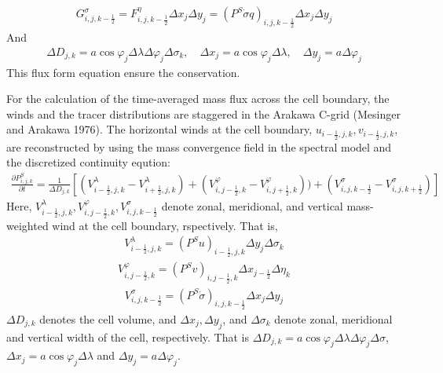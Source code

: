 \begin{eqnarray}G^{\sigma}_{i,j,k-\frac{1}{2}}=F^{\eta}_{i,j,k-\frac{1}{2}} \Delta x_{j} \Delta y_{j}=(P^{S} \dot{\sigma} q)_{i,j,k-\frac{1}{2}} \Delta x_{j} \Delta y_{j}\end{eqnarray} And
\begin{eqnarray}\Delta D_{j,k}=a \cos \varphi_{j} \Delta \lambda \Delta \varphi_{j} \Delta \sigma_{k},\quad \Delta x_{j}=a \cos \varphi_{j} \Delta \lambda,\quad \Delta y_{j}=a \Delta \varphi_{j}\end{eqnarray} This flux form
equation ensure the conservation.

For the calculation of the time-averaged mass flux across the cell boundary, the winds and the tracer distributions are staggered in the Arakawa C-grid (Mesinger and Arakawa 1976). The horizontal
winds at the cell boundary, \(u_{i-\frac{1}{2},j,k}, v_{i-\frac{1}{2},j,k}\), are reconstructed by using the mass convergence field in the spectral model and the discretized continuity eqution:
\begin{eqnarray}\frac{\partial P^{S}_{i,j,k} }{\partial t}=\frac{1}{\Delta D_{j,k}}[(V^{\lambda}_{i-\frac{1}{2},j,k}-V^{\lambda}_{i+\frac{1}{2},j,k})+(V^{\varphi}_{i,j-\frac{1}{2},k}-V^{\varphi}_{i,j+\frac{1}{2},k}))+(V^{\sigma}_{i,j,k-\frac{1}{2}}-V^{\sigma}_{i,j,k+\frac{1}{2}})]\end{eqnarray}
Here, \(V^{\lambda}_{i-\frac{1}{2},j,k}, V^{\varphi}_{i,j-\frac{1}{2},k}, V^{\sigma}_{i,j,k-\frac{1}{2}}\) denote zonal, meridional, and vertical mass-weighted wind at the cell boundary, rspectively.
That is, \begin{eqnarray}V^{\lambda}_{i-\frac{1}{2},j,k}=(P^{S}u)_{i-\frac{1}{2},j,k} \Delta y_{j} \Delta \sigma_{k}\end{eqnarray}
\begin{eqnarray}V^{\varphi}_{i,j-\frac{1}{2},k}=(P^{S}v)_{i,j-\frac{1}{2},k} \Delta x_{j-\frac{1}{2}} \Delta \eta_{k}\end{eqnarray}
\begin{eqnarray}V^{\sigma}_{i,j,k-\frac{1}{2}}=(P^{S}\dot{\sigma})_{i,j,k-\frac{1}{2}} \Delta x_{j} \Delta y_{j}\end{eqnarray} \(\Delta D_{j,k}\) denotes the cell volume, and \(\Delta x_{j}, \Delta y_{j}\), and
\(\Delta \sigma_{k}\) denote zonal, meridional and vertical width of the cell, respectively. That is \(\Delta D_{j,k}=a \cos \varphi_{j}\Delta \lambda \Delta \varphi_{j} \Delta \sigma\),
\(\Delta x_{j}=a \cos \varphi_{j} \Delta \lambda\) and \(\Delta y_{j}=a \Delta \varphi_{j}\).

